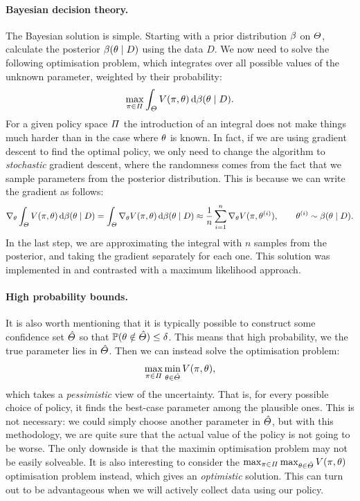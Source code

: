 {  \paragraph{Bayesian decision theory.} The Bayesian solution is simple. Starting with a prior distribution $\beta$ on $\Theta$, calculate the posterior $\beta(\theta \mid D)$ using the data $D$. We now need to solve the following optimisation problem, which integrates over all possible values of the unknown parameter, weighted by their probability:
  \[
    \max_{\pi \in \Pi} \int_\Theta V(\pi, \theta) \,\mathrm{d} \beta(\theta \mid D).
  \]
  For a given policy space $\Pi$ the introduction of an integral does not make things much harder than in the case where $\theta$ is known. In fact, if we are using gradient descent to find the optimal policy, we only need to change the algorithm to \emph{stochastic} gradient descent, where the randomness comes from the fact that we sample parameters from the posterior distribution. This is because we can write the gradient as follows:
  \[
    \nabla_\theta \int_\Theta V(\pi, \theta) \,\mathrm{d} \beta(\theta \mid D)
    =
    \int_\Theta \nabla_\theta V(\pi, \theta) \,\mathrm{d} \beta(\theta \mid D)
    \approx
    \frac{1}{n} \sum_{i=1}^n \nabla_\theta V(\pi, \theta^{(i)}), \qquad \theta^{(i)} \sim \beta(\theta \mid D).
  \]
  In the last step, we are approximating the integral with $n$ samples from the posterior, and taking the gradient separately for each one. This solution was implemented in \cite{dimitrakakis2017:subjective-fairness} and contrasted with a maximum likelihood approach.

  \paragraph{High probability bounds.} It is also worth mentioning that it is typically possible to construct some confidence set $\hat{\Theta}$ so that $\mathop{\mbox{\ensuremath{\mathbb{P}}}}\nolimits(\theta \notin \hat{\Theta}) \leq \delta$. This means that high probability, we the true parameter lies in $\hat{\Theta}$. Then we can instead solve the optimisation problem:
  \[
    \max_{\pi \in \Pi} \min_{\theta \in \hat{\Theta}} V(\pi, \theta),
  \]
  which takes a \emph{pessimistic} view of the uncertainty. That is, for every possible choice of policy, it finds the best-case parameter among the plausible ones. This is not necessary: we could simply choose another parameter in $\hat{\Theta}$, but with this methodology, we are quite sure that the actual value of the policy is not going to be worse. The only downside is that the maximin optimisation problem may not be easily solveable. It is also interesting to consider the $\max_{\pi \in \Pi} \max_{\theta \in \hat{\Theta}} V(\pi, \theta)$ optimisation problem instead, which gives an \emph{optimistic} solution. This can turn out to be advantageous when we will actively collect data using our policy.
}

